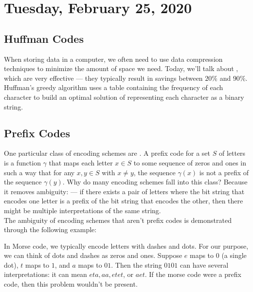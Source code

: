 \newpage
\section{Tuesday, February 25, 2020}

\subsection{Huffman Codes}

When storing data in a computer, we often need to use data compression techniques to minimize the amount of space we need. Today, we'll talk about , which are very effective --- they typically result in savings between $20\%$ and $90\%$. Huffman's greedy algorithm uses a table containing the frequency of each character to build an optimal solution of representing each character as a binary string.  \\

\subsection{Prefix Codes}

One particular class of encoding schemes are . A prefix code for a set $S$ of letters is a function $\gamma$ that maps each letter $x\in S$ to some sequence of zeros and ones in such a way that for any $x, y \in S$ with $x \neq y$, the sequence $\gamma(x)$ is not a prefix of the sequence $\gamma(y)$. Why do many encoding schemes fall into this class? Because it removes ambiguity: --- if there exists a pair of letters where the bit string that encodes one letter is a prefix of the bit string that encodes the other, then there might be multiple interpretations of the same string.  \\

The ambiguity of encoding schemes that aren't prefix codes is demonstrated through the following example:

\begin{example}
 In Morse code, we typically encode letters with dashes and dots. For our purpose, we can think of dots and dashes as zeros and ones. Suppose $e$ maps to $0$ (a single dot), $t$ maps to $1$, and $a$ maps to $01$. Then the string $0101$ can have several interpretations: it can mean $eta, aa, etet$, or $aet$. If the morse code were a prefix code, then this problem wouldn't be present.
\end{example}


